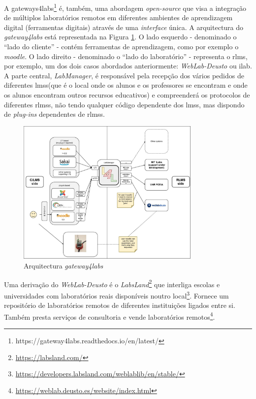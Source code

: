 A gateways4labs\footnote{https://gateway4labs.readthedocs.io/en/latest/} é, também, uma abordagem \textit{open-source} que visa a integração de múltiplos laboratórios remotos em diferentes ambientes de aprendizagem digital (ferramentas digitais) através de uma \textit{interface} única. 
A arquitectura do \textit{gateway4labs} está representada na Figura \ref{fig:arqgateway4labs}. O lado esquerdo - denominado o ``lado do cliente'' - contém ferramentas de aprendizagem, como por exemplo o \textit{moodle}. O lado direito - denominado o ``lado do laboratório'' - representa o \acrshort{rlms}, por exemplo, um dos dois casos abordados anteriormente: \textit{WebLab-Deusto} ou \acrshort{ilab}\cite{Orduñag4l}.
A parte central, \textit{LabManager}, é responsável pela recepção dos vários pedidos de diferentes \acrfull{lms}s(que é o local onde os alunos e os professores se encontram e onde os alunos encontram outros recursos educativos) e compreenderá os protocolos de diferentes \acrshort{rlms}s, não tendo qualquer código dependente dos \acrshort{lms}s, mas dispondo de \textit{plug-ins} dependentes de \acrshort{rlms}s\cite{Orduñag4l}\cite{g4ldocumentation}.
\begin{figure}[hbtp]
    \centering
    \includegraphics[width=0.8\textwidth]{figures/g4l_general_architecture.png}
    \caption{Arquitectura \textit{gateway4labs}}
    \label{fig:arqgateway4labs}
\end{figure}

Uma derivação do \textit{WebLab-Deusto} é o \textit{LabsLand}\footnote{\url{https://labsland.com/}} que interliga escolas e universidades com laboratórios reais disponíveis noutro local\footnote{\url{https://developers.labsland.com/weblablib/en/stable/}}. Fornece um repositório de laboratórios remotos de diferentes instituições ligados entre si. Também presta serviços de consultoria e vende laboratórios remotos\footnote{\url{https://weblab.deusto.es/website/index.html}}.


